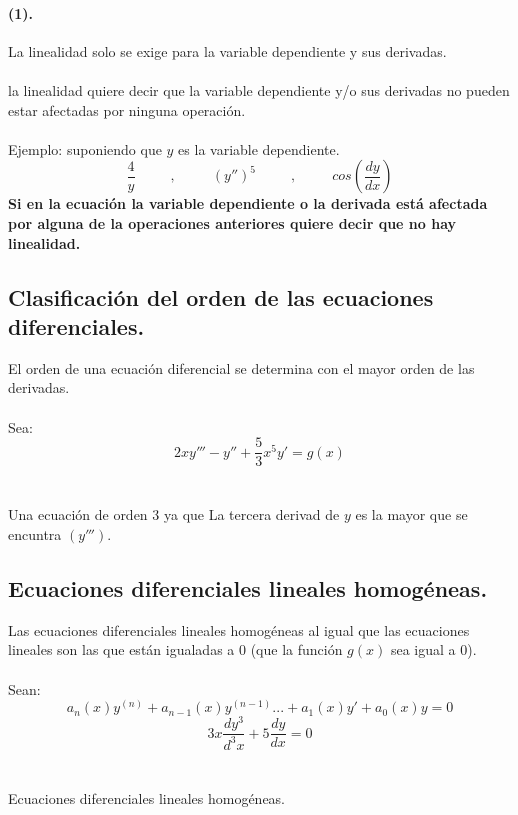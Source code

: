 \documentclass{article}
\begin{document}
\paragraph{(1).  }La linealidad solo se exige para la variable dependiente y sus derivadas.\\\\
 
la linealidad quiere decir que la variable dependiente y/o sus derivadas no pueden estar afectadas por ninguna operación.\\\\
 Ejemplo: suponiendo que $y$ es la variable dependiente. \begin{equation}
\frac{4}{y}\;\;\;\;\;\;\;\;\;,\;\;\;\;\;\;\;\;\; (y'')^5\;\;\;\;\;\;\;\;\;,\;\;\;\;\;\;\;\;\;cos(\frac{dy}{dx})
\end{equation}
\textbf{ Si en la ecuación la variable dependiente o la derivada  está afectada por alguna de la operaciones anteriores quiere decir que no hay linealidad.}

\subsection{Clasificación del orden de las ecuaciones diferenciales. }
El orden de una ecuación diferencial se determina con el mayor orden de las derivadas.
\\\\
Sea:\begin{equation}
2xy'''-y''+\frac{5}{3}x^5y'=g(x)
\end{equation}
\\\\
Una ecuación de orden $3 $ ya que La tercera derivad de $y$ es la mayor que se encuntra $(y''')$.

\subsection{Ecuaciones diferenciales  lineales homogéneas. }

Las ecuaciones diferenciales lineales homogéneas al igual que las ecuaciones lineales son las que están igualadas a $0$ (que la función $g(x)$  sea igual a 0).
\\\\
Sean:\begin{equation}
a_n(x)y^{(n)}+a_{n-1}(x)y^{(n-1)}...+a_1(x)y'+a_0(x)y= 0
\end{equation}
\begin{equation}
3x\frac{dy^3}{d^3x}+5\frac{dy}{dx}=0
\end{equation}
\\\\
Ecuaciones diferenciales lineales homogéneas.
\end{document}
